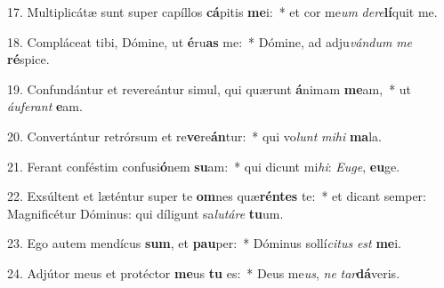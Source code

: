 17. Multiplicátæ sunt super capíllos \textbf{cá}pitis \textbf{me}i:~*  et cor me\textit{um} \textit{de}\textit{re}\textbf{lí}quit me.\

18. Compláceat tibi, Dómine, ut \textbf{é}ru\textbf{as} me:~*  Dómine, ad adju\textit{ván}\textit{dum} \textit{me} \textbf{ré}spice.\

19. Confundántur et revereántur simul, qui quærunt \textbf{á}nimam \textbf{me}am,~*  ut \textit{áu}\textit{fe}\textit{rant} \textbf{e}am.\

20. Convertántur retrórsum et re\textbf{ve}re\textbf{án}tur:~*  qui vo\textit{lunt} \textit{mi}\textit{hi} \textbf{ma}la.\

21. Ferant conféstim confusi\textbf{ó}nem \textbf{su}am:~*  qui dicunt mi\textit{hi}: \textit{Eu}\textit{ge}, \textbf{eu}ge.\

22. Exsúltent et læténtur super te \textbf{om}nes quæ\textbf{rén}\textbf{tes} te:~*  et dicant semper: Magnificétur Dóminus: qui díligunt sa\textit{lu}\textit{tá}\textit{re} \textbf{tu}um.\

23. Ego autem mendícus \textbf{sum}, et \textbf{pau}per:~*  Dóminus sollí\textit{ci}\textit{tus} \textit{est} \textbf{me}i.\

24. Adjútor meus et protéctor \textbf{me}us \textbf{tu} es:~*  Deus me\textit{us}, \textit{ne} \textit{tar}\textbf{dá}veris.\

